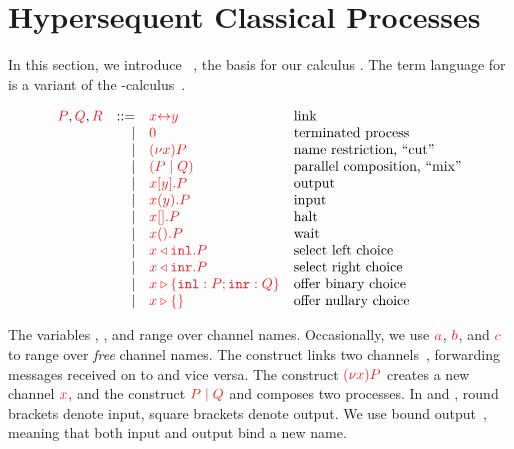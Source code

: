 \documentclass[envcountsame,envcountsect,UKenglish]{llncs}
\begin{document}
\section{Hypersequent Classical Processes}\label{sec:cp-revisited}
In this section, we introduce \dhcp~\parencite{kokke2018tlla,kokke2019pacmpl}, the basis for our calculus \nodcap. 
%
The term language for \hcp is a variant of the \textpi-calculus~\parencite{milner1992b}.
\begin{definition}[Terms]\label{def:hcp-terms}
  \[
    \begin{array}{lrll}
      \tm{P}, \tm{Q}, \tm{R}
        & ::=& \tm{\cpLink{x}{y}}    &\text{link}
      \\&\mid& \tm{\piHalt}          &\text{terminated process}
      \\&\mid& \tm{\piNew{x}{P}}     &\text{name restriction, ``cut''}
      \\&\mid& \tm{( \piPar{P}{Q} )} &\text{parallel composition, ``mix''}
      \\&\mid& \tm{\piSend{x}{y}{P}} &\text{output}
      \\&\mid& \tm{\piRecv{x}{y}{P}} &\text{input}
      \\&\mid& \tm{\piSend{x}{}{P}}  &\text{halt}
      \\&\mid& \tm{\cpWait{x}{}{P}}  &\text{wait}
      \\&\mid& \tm{\cpInl{x}{P}}     &\text{select left choice}
      \\&\mid& \tm{\cpInr{x}{P}}     &\text{select right choice}
      \\&\mid& \tm{\cpCase{x}{P}{Q}} &\text{offer binary choice}
      \\&\mid& \tm{\cpAbsurd{x}}     &\text{offer nullary choice}
    \end{array}
  \]
\end{definition}\noindent
The variables , ,  and  range over channel names. Occasionally, we use $\tm{a}$, $\tm{b}$, and $\tm{c}$ to range over \emph{free} channel names. The construct  links two channels~\parencite{sangiorgi1996,boreale1998}, forwarding messages received on  to  and vice versa. The construct $\tm{\piNew{x}{P}}$ creates a new channel $\tm{x}$, and the construct $\tm{\piPar{P}{Q}}$ and composes two processes. In  and , round brackets denote input, square brackets denote output. We use bound output~\parencite{sangiorgi1996}, meaning that both input and output bind a new name. 
\end{document}
